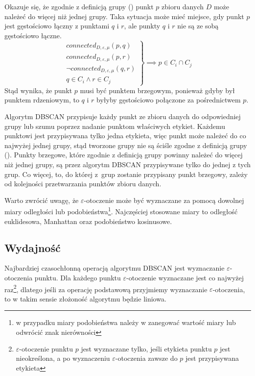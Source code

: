 Okazuje się, że zgodnie z definicją grupy () punkt $ p $ zbioru danych $ D $ może należeć do więcej niż jednej grupy. Taka sytuacja może mieć miejsce, gdy punkt $ p $ jest gęstościowo łączny z punktami $ q $ i $ r $, ale punkty $ q $ i $ r $ nie są ze sobą gęstościowo łączne.
\begin{equation}
  \left. \begin{array}{r}
		connected_{D,\varepsilon,\mu}(p, q) \\
		connected_{D,\varepsilon,\mu}(p, r) \\
		\neg connected_{D,\varepsilon,\mu}(q, r) \\
	 	q \in C_i \land r \in C_j
	\end{array} \right\}
	\implies	p \in C_i \cap C_j
\end{equation}
Stąd wynika, że punkt $ p $ musi być punktem brzegowym, ponieważ gdyby był punktem rdzeniowym, to $ q $ i $ r $ byłyby gęstościowo połączone za pośrednictwem $ p $.

Algorytm DBSCAN przypisuje każdy punkt ze zbioru danych do odpowiedniej grupy lub szumu poprzez nadanie punktom właściwych etykiet. Każdemu punktowi jest przypisywana tylko jedna etykieta, więc punkt może należeć do co najwyżej jednej grupy, stąd tworzone grupy nie są ściśle zgodne z definicją grupy (). Punkty brzegowe, które zgodnie z definicją grupy powinny należeć do więcej niż jednej grupy, są przez algorytm DBSCAN przypisywane tylko do jednej z tych grup. Co więcej, to, do której \mbox{z grup} zostanie przypisany punkt brzegowy, zależy od kolejności przetwarzania punktów zbioru danych.

Warto zwrócić uwagę, że $ \varepsilon $-otoczenie może być wyznaczane za pomocą dowolnej miary odległości lub podobieństwa\footnote{w przypadku miary podobieństwa należy w  zanegować wartość miary lub odwrócić znak nierówności}. Najczęściej stosowane miary to odległość euklidesowa, Manhattan oraz podobieństwo kosinusowe.



\subsection{Wydajność}
Najbardziej czasochłonną operacją algorytmu DBSCAN jest wyznaczanie $ \varepsilon $-otoczenia punktu. Dla każdego punktu $ \varepsilon $-otoczenie wyznaczane jest co najwyżej raz\footnote{$ \varepsilon $-otoczenie punktu $ p $ jest wyznaczane tylko, jeśli etykieta punktu $ p $ jest nieokreślona, a  po wyznaczeniu $ \varepsilon $-otoczenia zawsze do $ p $ jest przypisywana etykieta}, dlatego jeśli za operację podstawową przyjmiemy wyznaczanie $ \varepsilon $-otoczenia, to w takim sensie złożoność algorytmu będzie liniowa.

